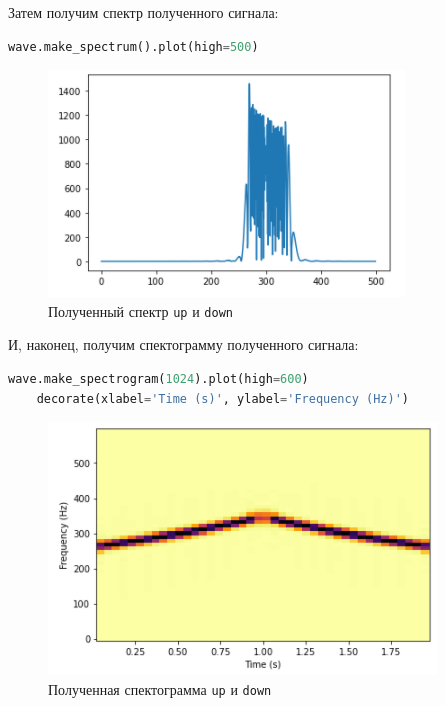 \documentclass[a4paper]{article}
\begin{document}
            Затем получим спектр полученного сигнала:
            
\begin{lstlisting}[language=Python, caption= Спектр сигнала \texttt{up} и \texttt{down}]
    wave.make_spectrum().plot(high=500)
\end{lstlisting}   
            
             \begin{figure}[H]
                \centering
                \includegraphics{ex_5_signal_up_down_spectr.png}
                \caption{Полученный спектр \texttt{up} и \texttt{down}}
                \label{fig:ex_5_signal_up_down_spectr}
            \end{figure}
            
            И, наконец, получим спектограмму полученного сигнала:
            
\begin{lstlisting}[language=Python, caption= Спектограмма сигнала \texttt{up} и \texttt{down}]
    wave.make_spectrogram(1024).plot(high=600)
    decorate(xlabel='Time (s)', ylabel='Frequency (Hz)')
\end{lstlisting}   
            
             \begin{figure}[H]
                \centering
                \includegraphics{ex_5_signal_up_down_spectogramma.png}
                \caption{Полученная спектограмма \texttt{up} и \texttt{down}}
                \label{fig:ex_5_signal_up_down_spectogramma}
            \end{figure}
           
\end{document}
